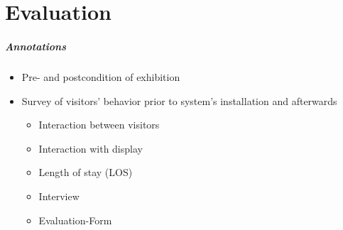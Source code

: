 \chapter{Evaluation}
\label{evaluation}

\paragraph{Annotations}

\begin{itemize}
	\item Pre- and postcondition of exhibition
	\item Survey of visitors' behavior prior to system's installation and afterwards
	\begin{itemize}
		\item Interaction between visitors
		\item Interaction with display
		\item Length of stay (LOS)
		\item Interview
		\item Evaluation-Form
	\end{itemize}
\end{itemize}
